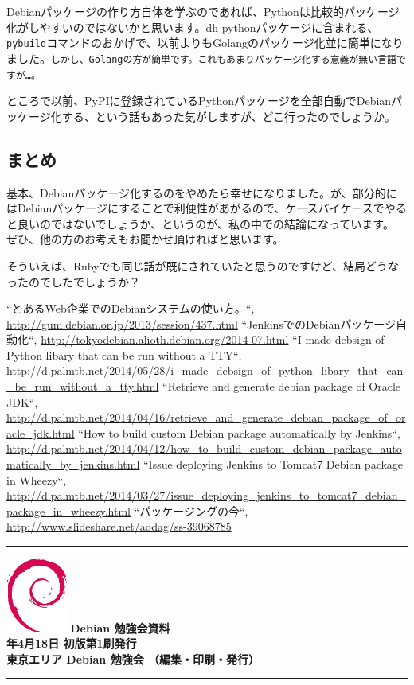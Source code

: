 \documentclass[mingoth,a4paper]{jsarticle}
\newcommand{\debmtgyear}{2015}
\newcommand{\debmtgmonth}{4}
\newcommand{\debmtgdate}{18}
\begin{document}
Debianパッケージの作り方自体を学ぶのであれば、Pythonは比較的パッケージ化がしやすいのではないかと思います。dh-pythonパッケージに含まれる、\texttt{pybuild}コマンドのおかげで、以前よりもGolangのパッケージ化並に簡単になりました。\texttt{しかし、Golangの方が簡単です。これもあまりパッケージ化する意義が無い言語ですが…。}


ところで以前、PyPIに登録されているPythonパッケージを全部自動でDebianパッケージ化する、という話もあった気がしますが、どこ行ったのでしょうか。

\subsection{まとめ}

基本、Debianパッケージ化するのをやめたら幸せになりました。が、部分的にはDebianパッケージにすることで利便性があがるので、ケースバイケースでやると良いのではないでしょうか、というのが、私の中での結論になっています。
ぜひ、他の方のお考えもお聞かせ頂ければと思います。

そういえば、Rubyでも同じ話が既にされていたと思うのですけど、結局どうなったのでしたでしょうか？

{\scriptsize
\begin{thebibliography}{9}
``とあるWeb企業でのDebianシステムの使い方。``, \url{http://gum.debian.or.jp/2013/session/437.html}
  \label{deb}
``JenkinsでのDebianパッケージ自動化``, \url{http://tokyodebian.alioth.debian.org/2014-07.html}
  \label{debci}
``I made debsign of Python libary that can be run without a TTY``, \url{http://d.palmtb.net/2014/05/28/i_made_debsign_of_python_libary_that_can_be_run_without_a_tty.html}
  \label{pydebsign}
  ``Retrieve and generate debian package of Oracle JDK``, \url{http://d.palmtb.net/2014/04/16/retrieve_and_generate_debian_package_of_oracle_jdk.html}
  ``How to build custom Debian package automatically by Jenkins``, \url{http://d.palmtb.net/2014/04/12/how_to_build_custom_debian_package_automatically_by_jenkins.html}
  ``Issue deploying Jenkins to Tomcat7 Debian package in Wheezy``, \url{http://d.palmtb.net/2014/03/27/issue_deploying_jenkins_to_tomcat7_debian_package_in_wheezy.html}
  ``パッケージングの今``, \url{http://www.slideshare.net/aodag/ss-39068785}
    \label{pythonpackage}
\end{thebibliography}
}

\newpage

\vspace*{15cm}
\hrule
\vspace{2mm}
\includegraphics[width=2cm]{image200502/openlogo-nd.eps}
\noindent \Large \bf Debian 勉強会資料\\
\noindent \normalfont \debmtgyear{}年\debmtgmonth{}月\debmtgdate{}日 \hspace{5mm}  初版第1刷発行\\
\noindent \normalfont 東京エリア Debian 勉強会 （編集・印刷・発行）\\
\hrule
\end{document}
